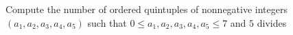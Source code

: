 Compute the number of ordered quintuples of nonnegative integers $(a_1,a_2,a_3,a_4,a_5)$ such that $0\leq a_1,a_2,a_3,a_4,a_5\leq 7$ and $5$ divides 